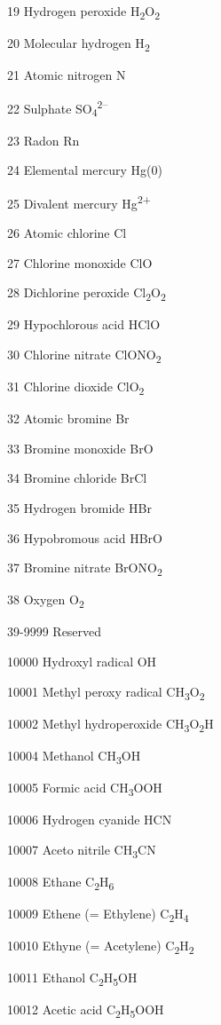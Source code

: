 19 Hydrogen peroxide H\textsubscript{2}O\textsubscript{2}

20 Molecular hydrogen H\textsubscript{2}

21 Atomic nitrogen N

22 Sulphate SO\textsubscript{4}\textsuperscript{2--}

23 Radon Rn

24 Elemental mercury Hg(0)

25 Divalent mercury Hg\textsuperscript{2+}

26 Atomic chlorine Cl

27 Chlorine monoxide ClO

28 Dichlorine peroxide Cl\textsubscript{2}O\textsubscript{2}

29 Hypochlorous acid HClO

30 Chlorine nitrate ClONO\textsubscript{2}

31 Chlorine dioxide ClO\textsubscript{2}

32 Atomic bromine Br

33 Bromine monoxide BrO

34 Bromine chloride BrCl

35 Hydrogen bromide HBr

36 Hypobromous acid HBrO

37 Bromine nitrate BrONO\textsubscript{2}

38 Oxygen O\textsubscript{2}

39-9999 Reserved

10000 Hydroxyl radical OH

10001 Methyl peroxy radical CH\textsubscript{3}O\textsubscript{2}

10002 Methyl hydroperoxide CH\textsubscript{3}O\textsubscript{2}H

10004 Methanol CH\textsubscript{3}OH

10005 Formic acid CH\textsubscript{3}OOH

10006 Hydrogen cyanide HCN

10007 Aceto nitrile CH\textsubscript{3}CN

10008 Ethane C\textsubscript{2}H\textsubscript{6}

10009 Ethene (= Ethylene) C\textsubscript{2}H\textsubscript{4}

10010 Ethyne (= Acetylene) C\textsubscript{2}H\textsubscript{2}

10011 Ethanol C\textsubscript{2}H\textsubscript{5}OH

10012 Acetic acid C\textsubscript{2}H\textsubscript{5}OOH

